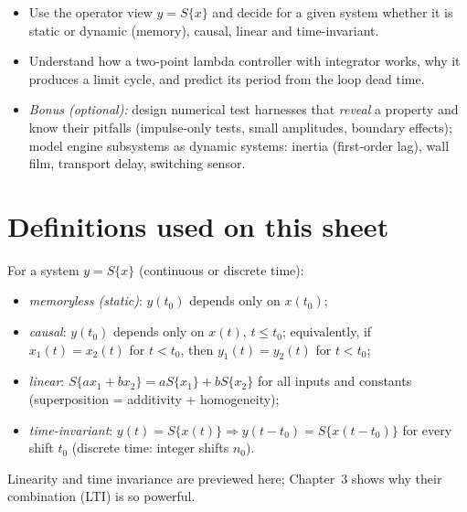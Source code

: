 
\begin{goals}
\begin{itemize}
  \item Use the operator view $y=S\{x\}$ and decide for a given system whether it
    is static or dynamic (memory), causal, linear and time-invariant.
  \item Understand how a two-point lambda controller with integrator works,
    why it produces a limit cycle, and predict its period from the loop dead
    time.
  \item \emph{Bonus (optional):} design numerical test harnesses that
    \emph{reveal} a property and know their pitfalls (impulse-only tests, small
    amplitudes, boundary effects); model engine subsystems as dynamic systems:
    inertia (first-order lag), wall film, transport delay, switching sensor.
\end{itemize}
\end{goals}

\section*{Definitions used on this sheet}
For a system $y=S\{x\}$ (continuous or discrete time):
\begin{itemize}
  \item \emph{memoryless (static)}: $y(t_0)$ depends only on $x(t_0)$;
  \item \emph{causal}: $y(t_0)$ depends only on $x(t)$, $t\le t_0$; equivalently,
    if $x_1(t)=x_2(t)$ for $t<t_0$, then $y_1(t)=y_2(t)$ for $t<t_0$;
  \item \emph{linear}: $S\{a x_1+b x_2\}=a S\{x_1\}+b S\{x_2\}$ for all inputs and
    constants (superposition = additivity + homogeneity);
  \item \emph{time-invariant}: $y(t)=S\{x(t)\}\Rightarrow y(t-t_0)=S\{x(t-t_0)\}$
    for every shift $t_0$ (discrete time: integer shifts $n_0$).
\end{itemize}
Linearity and time invariance are previewed here; Chapter~3 shows why their
combination (LTI) is so powerful.

